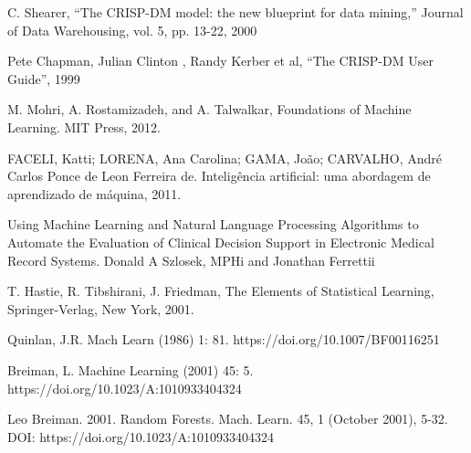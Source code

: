 \documentclass [12pt, a4paper] {article}
\begin{document}
\begin{thebibliography}{1}

   C. Shearer, “The CRISP-DM model: the new blueprint for data mining,” Journal of Data Warehousing, vol. 5, pp. 13-22, 2000

    Pete Chapman, Julian Clinton , Randy Kerber et al, “The CRISP-DM User Guide”, 1999 

   M. Mohri, A. Rostamizadeh, and A. Talwalkar, Foundations of
Machine Learning. MIT Press, 2012.

   FACELI, Katti; LORENA, Ana Carolina; GAMA, João; CARVALHO, André Carlos Ponce de Leon Ferreira de. Inteligência artificial: uma abordagem de aprendizado de máquina, 2011.
  
   Using Machine Learning and Natural Language Processing Algorithms to Automate the Evaluation of Clinical Decision Support in Electronic Medical Record Systems. Donald A Szlosek, MPHi and Jonathan Ferrettii
  
   T. Hastie, R. Tibshirani, J. Friedman, The Elements of Statistical Learning, Springer-Verlag, New York, 2001.
  
   Quinlan, J.R. Mach Learn (1986) 1: 81. https://doi.org/10.1007/BF00116251
  
   Breiman, L. Machine Learning (2001) 45: 5. https://doi.org/10.1023/A:1010933404324
  
   Leo Breiman. 2001. Random Forests. Mach. Learn. 45, 1 (October 2001), 5-32. DOI: https://doi.org/10.1023/A:1010933404324

    
\end{thebibliography}
\end{document}
